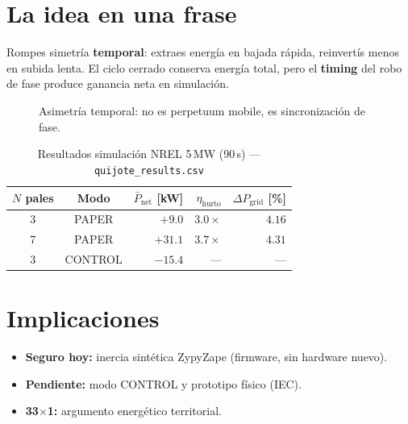 \documentclass[11pt,a4paper,twoside]{book}
\begin{document}
\section{La idea en una frase}
Rompes simetría \textbf{temporal}: extraes energía en bajada rápida,
reinvertís menos en subida lenta. El ciclo cerrado conserva energía total,
pero el \textbf{timing} del robo de fase produce ganancia neta en simulación.

\begin{figure}[htbp]
\centering
{}
\caption{Asimetría temporal: no es perpetuum mobile, es sincronización de fase.}
\end{figure}

\begin{table}[htbp]
\centering
\caption{Resultados simulación NREL 5\,MW (90\,s) — \texttt{quijote\_results.csv}}
\begin{tabular}{@{}ccrrr@{}}
\toprule
$N$ pales & Modo & $\bar P_{\mathrm{net}}$ [kW] & $\eta_{\mathrm{hurto}}$ & $\Delta P_{\mathrm{grid}}$ [\%] \\
\midrule
3 & PAPER & $+9.0$  & $3.0\times$ & $4.16$ \\
7 & PAPER & $+31.1$ & $3.7\times$ & $4.31$ \\
3 & CONTROL & $-15.4$ & --- & --- \\
\bottomrule
\end{tabular}
\end{table}

\section{Implicaciones}
\begin{itemize}[noitemsep]
  \item \textbf{Seguro hoy:} inercia sintética ZypyZape (firmware, sin hardware nuevo).
  \item \textbf{Pendiente:} modo CONTROL y prototipo físico (IEC).
  \item \textbf{33$\times$1:} argumento energético territorial.
\end{itemize}
\end{document}
